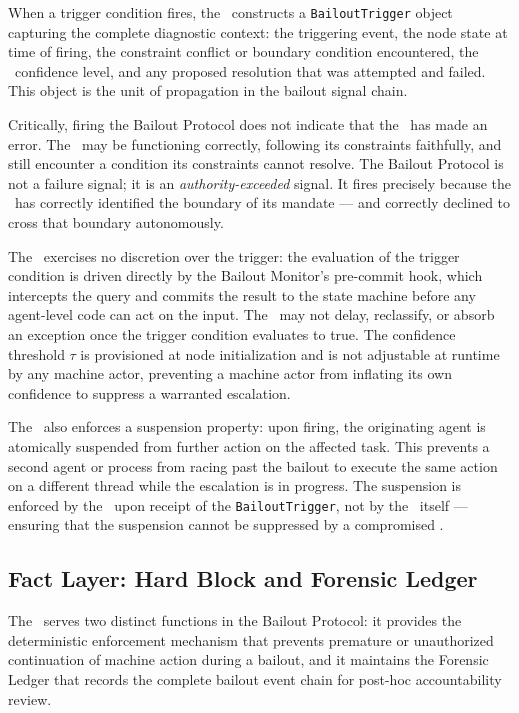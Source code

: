 When a trigger condition fires, the \bounds\ constructs a \texttt{BailoutTrigger} object capturing the complete diagnostic context: the triggering event, the node state at time of firing, the constraint conflict or boundary condition encountered, the \bounds\ confidence level, and any proposed resolution that was attempted and failed. This object is the unit of propagation in the bailout signal chain.

Critically, firing the Bailout Protocol does not indicate that the \bounds\ has made an error. The \bounds\ may be functioning correctly, following its constraints faithfully, and still encounter a condition its constraints cannot resolve. The Bailout Protocol is not a failure signal; it is an \textit{authority-exceeded} signal. It fires precisely because the \bounds\ has correctly identified the boundary of its mandate --- and correctly declined to cross that boundary autonomously.

The \bounds\ exercises no discretion over the trigger: the evaluation of the trigger condition is driven directly by the Bailout Monitor's pre-commit hook, which intercepts the query and commits the result to the state machine before any agent-level code can act on the input. The \bounds\ may not delay, reclassify, or absorb an exception once the trigger condition evaluates to true. The confidence threshold $\tau$ is provisioned at node initialization and is not adjustable at runtime by any machine actor, preventing a machine actor from inflating its own confidence to suppress a warranted escalation.

The \bounds\ also enforces a suspension property: upon firing, the originating agent is atomically suspended from further action on the affected task. This prevents a second agent or process from racing past the bailout to execute the same action on a different thread while the escalation is in progress. The suspension is enforced by the \fact\ upon receipt of the \texttt{BailoutTrigger}, not by the \bounds\ itself --- ensuring that the suspension cannot be suppressed by a compromised \bounds.

\subsection{Fact Layer: Hard Block and Forensic Ledger}
\label{sec:fact-enforcement}

The \fact\ serves two distinct functions in the Bailout Protocol: it provides the deterministic enforcement mechanism that prevents premature or unauthorized continuation of machine action during a bailout, and it maintains the Forensic Ledger that records the complete bailout event chain for post-hoc accountability review.

